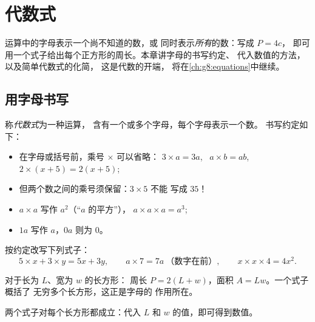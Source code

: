 \chapter{代数式}\label{ch:g7:literal}

运算中的字母表示一个尚不知道的数，或
同时表示\emph{所有}的数：写成 $P = 4c$，
即可用一个式子给出每个正方形的周长。本章讲字母的书写约定、
代入数值的方法，以及简单代数式的化简，
这是代数的开端，
将在\cref{ch:g8:equations}中继续。

\section{用字母书写}

\begin{definition}[代数式]\label{def:g7:literal:def}
称\emph{代数式}为一种运算，
含有一个或多个字母，每个字母表示一个数。
书写约定如下：
\begin{itemize}
  \item 在字母或括号前，乘号 $\times$ 可以省略：
        $3 \times a = 3a$, \ $a \times b = ab$, \
        $2 \times (x + 5) = 2(x + 5)$;
  \item 但两个数之间的乘号须保留：$3 \times 5$ 不能
        写成 $35$！
  \item $a \times a$ 写作 $a^2$（“$a$ 的平方”），
        $a \times a \times a = a^3$;
  \item $1a$ 写作 $a$，$0a$ 则为 $0$。
\end{itemize}
\end{definition}

\begin{example}\label{ex:g7:literal:write}
按约定改写下列式子：
\[
5 \times x + 3 \times y = 5x + 3y,
\qquad
a \times 7 = 7a \ \text{（数字在前）},
\qquad
x \times x \times 4 = 4x^2 .
\]
\end{example}

\begin{example}[公式也是代数式]\label{ex:g7:literal:formulas}
对于长为 $L$、宽为 $w$ 的长方形：
周长 $P = 2(L + w)$，面积 $A = Lw$。一个式子概括了
无穷多个长方形，这正是字母的
作用所在。
\end{example}

\begin{omfigure}

{\small 两个式子对每个长方形都成立：代入
$L$ 和 $w$ 的值，即可得到数值。}
\end{omfigure}

